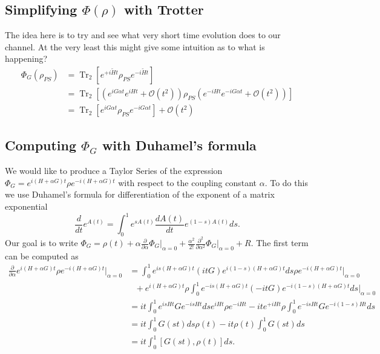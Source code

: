 \documentclass{article}
\newcommand{\parens}[1]{\left( #1 \right)}
\newcommand{\brackets}[1]{\left[ #1 \right]}
\newcommand{\bigo}[1]{\mathcal{O}\left( #1 \right)}
\DeclareMathOperator{\Tr}{Tr}
\newcommand{\partrace}[2]{\Tr_{#1} \brackets{ #2 }}
\begin{document}
\subsection{Simplifying $\Phi(\rho)$ with Trotter}
The idea here is to try and see what very short time evolution does to our channel. At the very least this might give some intuition as to what is happening?
\begin{align}
    \Phi_G(\rho_{PS}) &= \partrace{2}{e^{+i\widetilde{H}t} \rho_{PS} e^{-i \widetilde{H} t}} \\
    &= \partrace{2}{\parens{e^{i G \alpha t} e^{i H t} + \bigo{t^2}} \rho_{PS} \parens{e^{-iHt} e^{-i G \alpha t} + \bigo{t^2}}} \\
    &= \partrace{2}{e^{i G \alpha t} \rho_{PS} e^{-i G \alpha t}} + \bigo{t^2} 
\end{align}


\subsection{Computing $\Phi_G$ with Duhamel's formula}
We would like to produce a Taylor Series of the expression $\Phi_G = e^{i(H+\alpha G) t} \rho e^{-i(H+\alpha G) t}$ with respect to the coupling constant $\alpha$. To do this we use Duhamel's formula for differentiation of the exponent of a matrix exponential
\begin{equation}
    \frac{d}{dt} e^{A(t)} = \int_0^1 e^{s A(t)} \frac{d A(t)}{dt} e^{(1-s)A(t)} ds.
\end{equation}
Our goal is to write $\Phi_G = \rho(t) + \alpha \frac{\partial}{\partial \alpha} \Phi_G \big|_{\alpha=0} + \frac{\alpha^2}{2!} \frac{\partial^2}{\partial \alpha^2} \Phi_G \big|_{\alpha=0} + R$. The first term can be computed as
\begin{align}
    \frac{\partial}{\partial \alpha} e^{i(H+\alpha G)t} \rho e^{-i (H+\alpha G)t} \bigg|_{\alpha = 0} &= \int_{0}^{1} e^{i s (H+\alpha G)t} (i t G) e^{i (1-s) (H+\alpha G)t} ds \rho e^{-i(H+\alpha G)t} \bigg|_{\alpha=0} \nonumber \\
    &\text{ } + e^{i(H+\alpha G)t} \rho \int_{0}^1 e^{-i s (H+\alpha G) t} (- i t G) e^{-i (1-s) (H+\alpha G)t} ds \bigg|_{\alpha = 0} \label{eq:first_order_alpha_derivative}\\
    &= i t \int_0^1 e^{i s H t} G e^{-i s H t} ds e^{i H t} \rho e^{-i H t} - i t e^{+i H t} \rho \int_0^1 e^{-is H t} G e^{-i(1-s) Ht} ds \\
    &= i t \int_0^1 G(s t) ds \rho(t) - it \rho(t) \int_0^1 G(s t) ds \\
    &= i t \int_0^1 [G(s t), \rho(t)] ds.
\end{align}
\end{document}

